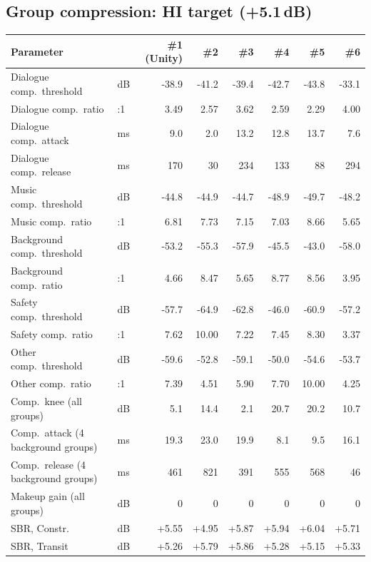 \documentclass[11pt]{article}
\begin{document}
\subsection*{Group compression: HI target (+5.1\,dB)}
\begin{table}[H]\centering\scriptsize
\begin{tabular}{@{}l l rrrrrr@{}}
\toprule
\textbf{Parameter} & & \textbf{\#1} \textbf{(Unity)} & \textbf{\#2} & \textbf{\#3} & \textbf{\#4} & \textbf{\#5} & \textbf{\#6} \\
\midrule
Dialogue comp.\ threshold & dB & -38.9 & -41.2 & -39.4 & -42.7 & -43.8 & -33.1 \\
Dialogue comp.\ ratio & :1 & 3.49 & 2.57 & 3.62 & 2.59 & 2.29 & 4.00 \\
Dialogue comp.\ attack & ms & 9.0 & 2.0 & 13.2 & 12.8 & 13.7 & 7.6 \\
Dialogue comp.\ release & ms & 170 & 30 & 234 & 133 & 88 & 294 \\
Music comp.\ threshold & dB & -44.8 & -44.9 & -44.7 & -48.9 & -49.7 & -48.2 \\
Music comp.\ ratio & :1 & 6.81 & 7.73 & 7.15 & 7.03 & 8.66 & 5.65 \\
Background comp.\ threshold & dB & -53.2 & -55.3 & -57.9 & -45.5 & -43.0 & -58.0 \\
Background comp.\ ratio & :1 & 4.66 & 8.47 & 5.65 & 8.77 & 8.56 & 3.95 \\
Safety comp.\ threshold & dB & -57.7 & -64.9 & -62.8 & -46.0 & -60.9 & -57.2 \\
Safety comp.\ ratio & :1 & 7.62 & 10.00 & 7.22 & 7.45 & 8.30 & 3.37 \\
Other comp.\ threshold & dB & -59.6 & -52.8 & -59.1 & -50.0 & -54.6 & -53.7 \\
Other comp.\ ratio & :1 & 7.39 & 4.51 & 5.90 & 7.70 & 10.00 & 4.25 \\
Comp.\ knee (all groups) & dB & 5.1 & 14.4 & 2.1 & 20.7 & 20.2 & 10.7 \\
Comp.\ attack (4 background groups) & ms & 19.3 & 23.0 & 19.9 & 8.1 & 9.5 & 16.1 \\
Comp.\ release (4 background groups) & ms & 461 & 821 & 391 & 555 & 568 & 46 \\
Makeup gain (all groups) & dB & 0 & 0 & 0 & 0 & 0 & 0 \\
\midrule
SBR, Constr. & dB & +5.55 & +4.95 & +5.87 & +5.94 & +6.04 & +5.71 \\
SBR, Transit & dB & +5.26 & +5.79 & +5.86 & +5.28 & +5.15 & +5.33 \\

\end{tabular}
\end{table}
\end{document}
